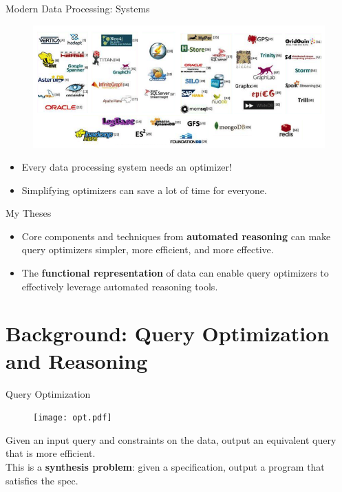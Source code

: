 \documentclass{beamer}
\begin{document}
  \begin{frame}{Modern Data Processing: Systems}
    \begin{figure}
    \includegraphics[width=\linewidth]{systems.png}
    \end{figure}
    \begin{itemize}
      \item Every data processing system needs an optimizer!
      \item Simplifying optimizers can save a lot of time for everyone.
    \end{itemize}
  \end{frame}

  \begin{frame}{My Theses}
    \begin{itemize}
      \item Core components and techniques from \textbf{automated reasoning}
      can make query optimizers simpler, more efficient,
      and more effective. \pause
      \item The \textbf{functional representation} of data can enable query 
      optimizers to effectively leverage automated reasoning tools.
    \end{itemize}
  \end{frame}

  \section{Background: Query Optimization and Reasoning}
  \begin{frame}{Query Optimization}
    \begin{figure}
      \texttt{[image: opt.pdf]}
    \end{figure}
    Given an input query and constraints on the data, 
    output an equivalent query that is more efficient. \pause \\
    This is a \textbf{synthesis problem}: given a specification,
    output a program that satisfies the spec.
  \end{frame}
\end{document}
